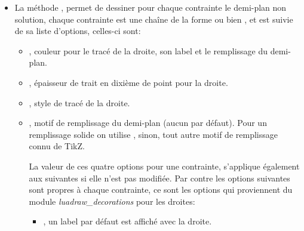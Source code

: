 \begin{itemize}
\begin{itemize}
\begin{itemize}
                \item {}, point d'ancrage du label, par défaut c'est le point où est réalisé l'extremum (on peut utiliser aussi ).
                
                \item {}, sens d'écriture du label, par défaut c'est la direction de la droite.
                
                \item {}, position du label par rapport à son point d'ancrage, par défaut le label est placé de l'autre côté du polygone solution.
            \end{itemize}
    \end{itemize}
    
    \item La méthode , permet de dessiner pour chaque contrainte le demi-plan non solution, chaque contrainte est une chaîne de la forme  ou bien , et est suivie de sa liste d'options, celles-ci sont:
    \begin{itemize}
        \item {}, couleur pour le tracé de la droite, son label et le remplissage du demi-plan.

        \item {}, épaisseur de trait en dixième de point pour la droite.

        \item {}, style de tracé de la droite.
        
        \item {}, motif de remplissage du demi-plan (aucun par défaut). Pour un remplissage solide on utilise , sinon, tout autre motif de remplissage connu de TikZ.
        
        La valeur de ces quatre options pour une contrainte, s'applique également aux suivantes si elle n'est pas modifiée. Par contre les options suivantes sont propres à chaque contrainte, ce sont les options qui proviennent du module \emph{luadraw\_decorations} pour les droites:
            \begin{itemize}
                \item {}, un label par défaut est affiché avec la droite.


\end{itemize}
\end{itemize}
\end{itemize}
